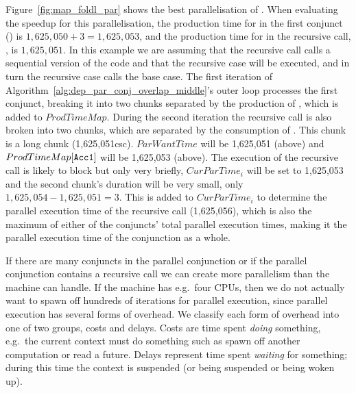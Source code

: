 Figure~\ref{fig:map_foldl_par} shows the best parallelisation of
\mapfoldl.
When evaluating the speedup for this parallelisation,
the production time for  in the first conjunct
()
is
$1,625,050 + 3 = 1,625,053$, and
the production time for  in the recursive call,
,
is $1,625,051$.
In this example we are assuming that the recursive call calls a sequential
version of the code and that the recursive case will be executed,
and in turn the recursive case calls the base case.
The first iteration of
Algorithm~\ref{alg:dep_par_conj_overlap_middle}'s outer loop processes the
first conjunct,
breaking it into two chunks separated by the production of ,
which is added to $ProdTimeMap$.
During the second iteration the recursive call is also broken into two
chunks, which are separated by the consumption of .
This chunk is a long chunk (1,625,051csc).
$ParWantTime$ will be 1,625,051 (above) and $ProdTimeMap[\text{{\tt Acc1}}]$
will be 1,625,053 (above).
The execution of the recursive call is likely to block
but only very briefly,
$CurParTime_i$ will be set to 1,625,053 and the second chunk's duration will
be very small, only $1,625,054 - 1,625,051 = 3$.
This is added to $CurParTime_i$ to determine the parallel execution time of
the recursive call (1,625,056),
which is also the maximum of either of the conjuncts' total parallel
execution times,
making it the parallel execution time of the conjunction as a whole.

If there are many conjuncts in the parallel conjunction or if the parallel
conjunction contains a recursive call we can create more parallelism than
the machine can handle.
If the machine has e.g.\ four CPUs,
then we do not actually want to spawn off
hundreds of iterations for parallel execution,
since parallel execution has several forms of overhead.
We classify each form of overhead into one of two groups, costs and delays.
Costs are time spent \emph{doing} something,
e.g.\ the current context must do something such as spawn off another
computation or read a future.
Delays represent time spent \emph{waiting} for something;
during this time the context is suspended (or being suspended or being woken
up).

